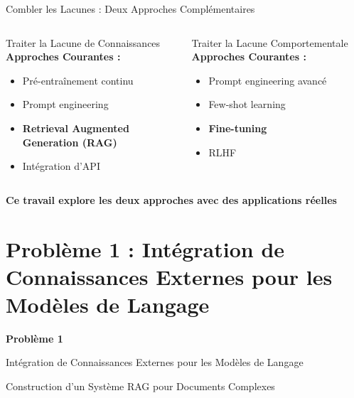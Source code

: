 \documentclass[11pt, aspectratio=169, xcolor=table]{beamer}
\begin{document}
\begin{frame}{Combler les Lacunes : Deux Approches Complémentaires}
    \begin{columns}[T]
        \begin{block}{Traiter la Lacune de Connaissances}
            \textbf{Approches Courantes :}
            \begin{itemize}
                \item Pré-entraînement continu
                \item Prompt engineering
                \item \textbf{\color{MainNavy}Retrieval Augmented Generation (RAG)}
                \item Intégration d'API
            \end{itemize} 
        \end{block}

        \begin{block}{Traiter la Lacune Comportementale}
            \textbf{Approches Courantes :}
            \begin{itemize}
                \item Prompt engineering avancé
                \item Few-shot learning 
                \item \textbf{\color{MainNavy}Fine-tuning}
                \item RLHF
            \end{itemize}  
        \end{block}
    \end{columns}
    
    \vspace{0.4cm}
    \begin{center}
        \textbf{\color{MainNavy}Ce travail explore les deux approches avec des applications réelles}
    \end{center}
\end{frame}

\section{Problème 1 : Intégration de Connaissances Externes pour les Modèles de Langage}

\begin{frame}[plain]
    \begin{center}
        \vfill
        {\Huge\color{MainNavy}\textbf{Problème 1}}
        \vspace{0.5cm}
        
        {\Large Intégration de Connaissances Externes pour les Modèles de Langage}
        \vspace{0.3cm}
        
        {\large Construction d'un Système RAG pour Documents Complexes}
        \vfill
    \end{center}
\end{frame}
\end{document}
